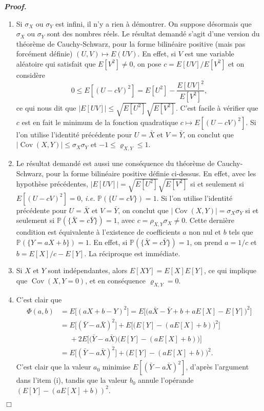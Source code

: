 \documentclass[11pt,a4paper]{article}
\newenvironment{preuve}[1][]
{\vskip 2mm  \noindent\emph{\bf Proof#1. }}{$\Box$ \vskip 2mm}
\let\leq\leqslant
\begin{document}
		\begin{preuve}
			\begin{enumerate}
				\item Si $\sigma_X$ ou $\sigma_Y$ est infini, il n'y a rien à démontrer. 
				On suppose désormais que $\sigma_X$ ou $\sigma_Y$ sont des nombres réels. 
				Le résultat demandé s'agit d'une version du théorème de Cauchy-Schwarz, pour la forme bilinéaire positive (mais pas forcément définie) 
				$(U,V) \mapsto E(U V)$. 
				En effet, si $V$ est une variable aléatoire qui satisfait que $E[V^{2}]\neq0$, on pose $c = E[UV]/E[V^{2}]$ et on considère 
				\[     0 \leq E[(U - cV)^2] =  E[U^{2}] - \frac{E[U V]^{2}}{E[V^{2}]},     \]
				ce qui nous dit que $|E[U V]| \leq \sqrt{E[U^{2}]} \sqrt{E[V^{2}]}$. 
				C'est facile à vérifier que $c$ est en fait le minimum de la fonction quadratique $c \mapsto E[(U - cV)^2]$. 
				Si l'on utilise l'identité précédente pour $U = \bar{X}$ et $V = \bar{Y}$, on conclut que 
				$|\operatorname{Cov}(X,Y)| \leq \sigma_X\sigma_Y$ et $-1 \leq \varrho_{X,Y} \leq 1$. 
				
				\item Le résultat demandé est aussi une conséquence du théorème de Cauchy-Schwarz, pour la forme bilinéaire positive définie ci-dessus. 
				En effet, avec les hypothèse précédentes, $|E[U V]| = \sqrt{E[U^{2}]} \sqrt{E[V^{2}]}$ si et seulement si $E[(U - cV)^2] = 0$, 
				\textit{i.e.} $\mathbb{P}(\{ U = cV \})=1$. 
				Si l'on utilise l'identité précédente pour $U = \bar{X}$ et $V = \bar{Y}$, on conclut que 
				$|\operatorname{Cov}(X,Y)| = \sigma_X\sigma_Y$ si et seulement si 
				$\mathbb{P}(\{ \bar{X} = c \bar{Y} \})=1$, avec $c = \rho_{X,Y} \sigma_{X} \neq 0$. 
				Cette dernière condition est équivalente à l'existence de coefficients $a$ non nul et $b$ tels que $\mathbb{P}(\{Y=aX+b\})=1$. 
				En effet, si $\mathbb{P}(\{ \bar{X} = c \bar{Y} \})=1$, on prend $a = 1/c$ et $b = E[X]/c - E[Y]$.
				La réciproque est immédiate. 
				
				\item Si $X$ et $Y$ sont indépendantes, alors $E[X Y] = E[X] E[Y]$, ce qui implique que $\operatorname{Cov}(X,Y = 0)$, 
				et en conséquence $\varrho_{X,Y} = 0$. 
				
				\item  C'est clair que 
				\begin{align*} 
				\Phi(a,b)&=E\big[(aX+b-Y)^2\big] = E\Big[\big(a\bar{X}-\bar{Y} + b + a E[X] - E[Y]\big)^2\Big]
				\\
				&= E\big[(\bar{Y}-a\bar{X})^2\big]+E\Big[\big(E[Y]-(aE[X]+b)\big)^2\Big] 
				\\
				&\phantom{=}+ 2E\Big[\big(\bar{Y}-a\bar{X}\big)\big(E[Y]-(aE[X]+b)\big)\Big] 
				\\
				&= E\big[(\bar{Y}-a\bar{X})^2\big]+\big(E[Y]-(aE[X]+b)\big)^2.  
				\end{align*}
				C'est clair que la valeur $a_{0}$ minimise $E[(\bar{Y}-a\bar{X})^2]$, d'après l'argument dans l'item (i), 
				tandis que la valeur $b_{0}$ annule l'opérande $(E[Y]-(aE[X]+b))^{2}$. 
				

\end{enumerate}
\end{preuve}
\end{document}
